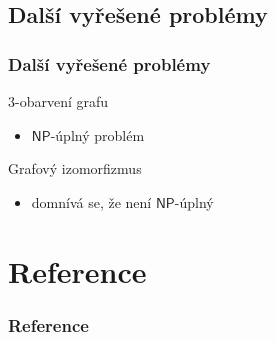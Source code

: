 \documentclass[10pt]{beamer}
\newcommand{\NP}{\mathsf{NP}}
\theoremstyle{definition}
\theoremstyle{remark}
\begin{document}
\subsection{Další vyřešené problémy}
\begin{frame}
\frametitle{Další vyřešené problémy}
	$3$-obarvení grafu
	\begin{itemize}
		\item $\NP$-úplný problém
	\end{itemize}
	Grafový izomorfizmus
	\begin{itemize}
		\item domnívá se, že není $\NP$-úplný
	\end{itemize}
\end{frame}

\section*{Reference}
\begin{frame}[allowframebreaks=0.95]
\frametitle{Reference}
	{}
	
\end{frame}
\end{document}
